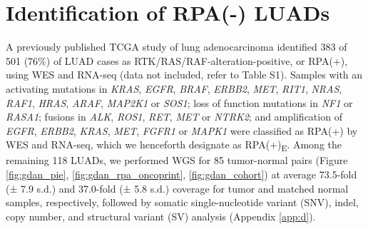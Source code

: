 \documentclass[phd,tocprelim]{cornell}
\renewcommand{\caption}[1]{\singlespacing\hangcaption{#1}\normalspacing}
\begin{document}
\section{Identification of RPA(-) LUADs}



A previously published TCGA study of lung adenocarcinoma \cite{Campbell2016-xv} identified 383 of 501 (76\%) of LUAD cases as RTK/RAS/RAF-alteration-positive, or RPA(+), using WES and RNA-seq (data not included, refer to \cite{Carrot-Zhang2020-vl} Table S1). Samples with an activating mutations in \textit{KRAS}, \textit{EGFR}, \textit{BRAF}, \textit{ERBB2}, \textit{MET}, \textit{RIT1}, \textit{NRAS}, \textit{RAF1}, \textit{HRAS}, \textit{ARAF}, \textit{MAP2K1} or \textit{SOS1}; loss of function mutations in \textit{NF1} or \textit{RASA1}; fusions in \textit{ALK}, \textit{ROS1}, \textit{RET}, \textit{MET} or \textit{NTRK2}; and amplification of \textit{EGFR}, \textit{ERBB2}, \textit{KRAS}, \textit{MET}, \textit{FGFR1} or \textit{MAPK1} were classified as RPA(+) by WES and RNA-seq, which we henceforth designate as RPA(+)\textsubscript{E}. Among the remaining 118 LUADs, we performed WGS for 85 tumor-normal pairs (Figure \ref{fig:gdan_pie}, \ref{fig:gdan_rpa_oncoprint}, \ref{fig:gdan_cohort}) at average 73.5-fold (± 7.9 s.d.) and 37.0-fold (± 5.8 s.d.) coverage for tumor and matched normal samples, respectively, followed by somatic single-nucleotide variant (SNV), indel, copy number, and structural variant (SV) analysis (Appendix \ref{app:d}).
\end{document}
